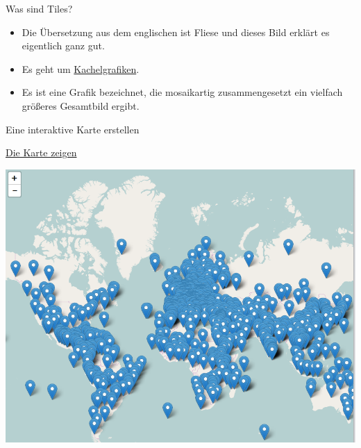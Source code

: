 \documentclass[ignorenonframetext,]{beamer}
\newenvironment{Shaded}{}{}
\newcommand{\KeywordTok}[1]{\textcolor[rgb]{0.00,0.44,0.13}{\textbf{{#1}}}}
\newcommand{\DataTypeTok}[1]{\textcolor[rgb]{0.56,0.13,0.00}{{#1}}}
\newcommand{\StringTok}[1]{\textcolor[rgb]{0.25,0.44,0.63}{{#1}}}
\newcommand{\CommentTok}[1]{\textcolor[rgb]{0.38,0.63,0.69}{\textit{{#1}}}}
\newcommand{\NormalTok}[1]{{#1}}
\providecommand{\tightlist}{%
\setlength{\itemsep}{0pt}\setlength{\parskip}{0pt}}
\begin{document}
\begin{frame}{Was sind Tiles?}

\begin{itemize}
\tightlist
\item
  Die Übersetzung aus dem englischen ist Fliese und dieses Bild erklärt
  es eigentlich ganz gut.
\item
  Es geht um
  \href{https://de.wikipedia.org/wiki/Kachelgrafik}{Kachelgrafiken}.
\item
  Es ist eine Grafik bezeichnet, die mosaikartig zusammengesetzt ein
  vielfach größeres Gesamtbild ergibt.
\end{itemize}

\end{frame}

\begin{frame}[fragile]{Eine interaktive Karte erstellen}

\begin{Shaded}
\end{Shaded}

\end{frame}

\begin{frame}{\href{https://rpubs.com/Japhilko82/WorldHeritageSites}{Die
Karte zeigen}}

\includegraphics{./tex2pdf.956/5d9dbf801ab1bb41813925da4cff1a84779f8070.png}

\end{frame}
\end{document}
